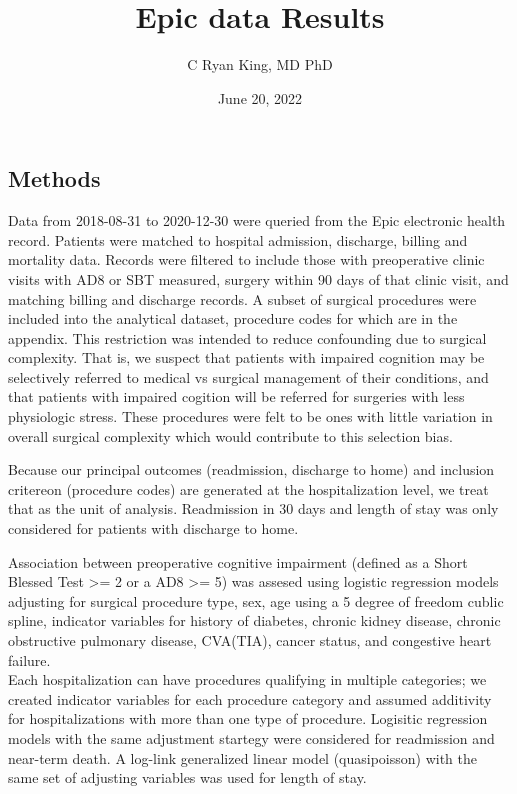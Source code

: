 \documentclass[
]{article}
\title{Epic data Results}
\author{C Ryan King, MD PhD}
\date{June 20, 2022}
\begin{document}
\maketitle

\hypertarget{methods}{%
\subsection{Methods}\label{methods}}

Data from 2018-08-31 to 2020-12-30 were queried from the Epic electronic health record.
Patients were matched to hospital admission, discharge, billing and mortality data.
Records were filtered to include those with preoperative clinic visits with AD8 or SBT measured, surgery within 90 days of that clinic visit, and matching billing and discharge records.
A subset of surgical procedures were included into the analytical dataset, procedure codes for which are in the appendix. This restriction was intended to reduce confounding due to surgical complexity.
That is, we suspect that patients with impaired cognition may be selectively referred to medical vs surgical management of their conditions, and that patients with impaired cogition will be referred for surgeries with less physiologic stress.
These procedures were felt to be ones with little variation in overall surgical complexity which would contribute to this selection bias.

Because our principal outcomes (readmission, discharge to home) and inclusion critereon (procedure codes) are generated at the hospitalization level, we treat that as the unit of analysis.
Readmission in 30 days and length of stay was only considered for patients with discharge to home.

Association between preoperative cognitive impairment (defined as a Short Blessed Test \textgreater= 2 or a AD8 \textgreater= 5) was assesed using logistic regression models adjusting for surgical procedure type, sex, age using a 5 degree of freedom cublic spline, indicator variables for history of diabetes, chronic kidney disease, chronic obstructive pulmonary disease, CVA(TIA), cancer status, and congestive heart failure.\\
Each hospitalization can have procedures qualifying in multiple categories; we created indicator variables for each procedure category and assumed additivity for hospitalizations with more than one type of procedure.
Logisitic regression models with the same adjustment startegy were considered for readmission and near-term death.
A log-link generalized linear model (quasipoisson) with the same set of adjusting variables was used for length of stay.
\end{document}
